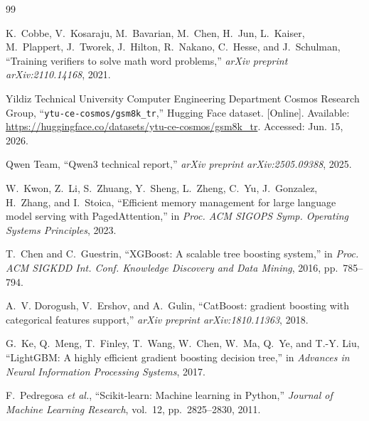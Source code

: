 \documentclass[conference]{IEEEtran}
\begin{document}
\FloatBarrier

\begin{thebibliography}{99}

K.~Cobbe, V.~Kosaraju, M.~Bavarian, M.~Chen, H.~Jun, L.~Kaiser, M.~Plappert,
J.~Tworek, J.~Hilton, R.~Nakano, C.~Hesse, and J.~Schulman, ``Training
verifiers to solve math word problems,'' \emph{arXiv preprint
arXiv:2110.14168}, 2021.

Yildiz Technical University Computer Engineering Department Cosmos Research
Group, ``\texttt{ytu-ce-cosmos/gsm8k\_tr},'' Hugging Face dataset. [Online].
Available: \url{https://huggingface.co/datasets/ytu-ce-cosmos/gsm8k_tr}.
Accessed: Jun. 15, 2026.

Qwen Team, ``Qwen3 technical report,'' \emph{arXiv preprint arXiv:2505.09388},
2025.

W.~Kwon, Z.~Li, S.~Zhuang, Y.~Sheng, L.~Zheng, C.~Yu, J.~Gonzalez,
H.~Zhang, and I.~Stoica, ``Efficient memory management for large language model
serving with PagedAttention,'' in \emph{Proc. ACM SIGOPS Symp. Operating
Systems Principles}, 2023.

T.~Chen and C.~Guestrin, ``XGBoost: A scalable tree boosting system,'' in
\emph{Proc. ACM SIGKDD Int. Conf. Knowledge Discovery and Data Mining}, 2016,
pp.~785--794.

A.~V. Dorogush, V.~Ershov, and A.~Gulin, ``CatBoost: gradient boosting with
categorical features support,'' \emph{arXiv preprint arXiv:1810.11363}, 2018.

G.~Ke, Q.~Meng, T.~Finley, T.~Wang, W.~Chen, W.~Ma, Q.~Ye, and T.-Y. Liu,
``LightGBM: A highly efficient gradient boosting decision tree,'' in
\emph{Advances in Neural Information Processing Systems}, 2017.

F.~Pedregosa \emph{et al.}, ``Scikit-learn: Machine learning in Python,''
\emph{Journal of Machine Learning Research}, vol.~12, pp.~2825--2830, 2011.

\end{thebibliography}
\end{document}
